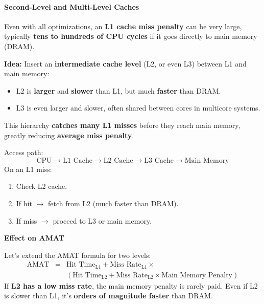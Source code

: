 \paragraph{Second-Level and Multi-Level Caches}

Even with all optimizations, an \textbf{L1 cache miss penalty} can be very large, typically \textbf{tens to hundreds of CPU cycles} if it goes directly to main memory (DRAM).

\highspace
\textbf{Idea:} Insert an \textbf{intermediate cache level} (L2, or even L3) between L1 and main memory:
\begin{itemize}
    \item L2 is \textbf{larger} and \textbf{slower} than L1, but much \textbf{faster} than DRAM.
    \item L3 is even larger and slower, often shared between cores in multicore systems.
\end{itemize}
This hierarchy \textbf{catches many L1 misses} before they reach main memory, greatly reducing \textbf{average miss penalty}.

\highspace
Access path:
\begin{equation*}
    \text{CPU} \rightarrow \text{L1 Cache} \rightarrow \text{L2 Cache} \rightarrow \text{L3 Cache} \rightarrow \text{Main Memory}
\end{equation*}
On an L1 miss:
\begin{enumerate}
    \item Check L2 cache.
    \item If hit $\rightarrow$ fetch from L2 (much faster than DRAM).
    \item If miss $\rightarrow$ proceed to L3 or main memory.
\end{enumerate}

\highspace
\begin{flushleft}
    \textcolor{Green3}{ \textbf{Effect on AMAT}}
\end{flushleft}
Let's extend the AMAT formula for two levels:
\begin{equation}
    \begin{array}{rcl}
        \text{AMAT} &=& \text{Hit Time}_{\text{L1}} + \text{Miss Rate}_{\text{L1}} \times \\ [.3em]
        && \left(\text{Hit Time}_{\text{L2}} + \text{Miss Rate}_{\text{L2}} \times \text{Main Memory Penalty}\right)
    \end{array}
\end{equation}
If \textbf{L2 has a low miss rate}, the main memory penalty is rarely paid. Even if L2 is slower than L1, it's \textbf{orders of magnitude faster} than DRAM.

